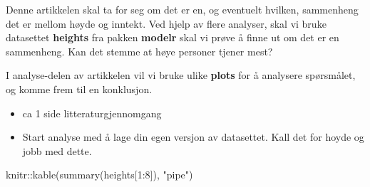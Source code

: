 \documentclass[
  12pt,
  norsk,
]{article}
\newenvironment{Shaded}{\begin{snugshade}}{\end{snugshade}}
\newcommand{\DecValTok}[1]{\textcolor[rgb]{0.00,0.00,0.81}{#1}}
\newcommand{\FunctionTok}[1]{\textcolor[rgb]{0.00,0.00,0.00}{#1}}
\newcommand{\NormalTok}[1]{#1}
\newcommand{\SpecialCharTok}[1]{\textcolor[rgb]{0.00,0.00,0.00}{#1}}
\newcommand{\StringTok}[1]{\textcolor[rgb]{0.31,0.60,0.02}{#1}}
\begin{document}
Denne artikkelen skal ta for seg om det er en, og eventuelt hvilken,
sammenheng det er mellom høyde og inntekt. Ved hjelp av flere analyser,
skal vi bruke datasettet \textbf{heights} fra pakken \textbf{modelr}
skal vi prøve å finne ut om det er en sammenheng. Kan det stemme at høye
personer tjener mest?

I analyse-delen av artikkelen vil vi bruke ulike \textbf{plots} for å
analysere spørsmålet, og komme frem til en konklusjon.

\begin{itemize}
\item
  ca 1 side litteraturgjennomgang
\item
  Start analyse med å lage din egen versjon av datasettet. Kall det for
  hoyde og jobb med dette.
\end{itemize}

\begin{Shaded}
\begin{Highlighting}[]
\NormalTok{knitr}\SpecialCharTok{::}\FunctionTok{kable}\NormalTok{(}\FunctionTok{summary}\NormalTok{(heights[}\DecValTok{1}\SpecialCharTok{:}\DecValTok{8}\NormalTok{]), }\StringTok{"pipe"}\NormalTok{)}
\end{Highlighting}
\end{Shaded}
\end{document}
